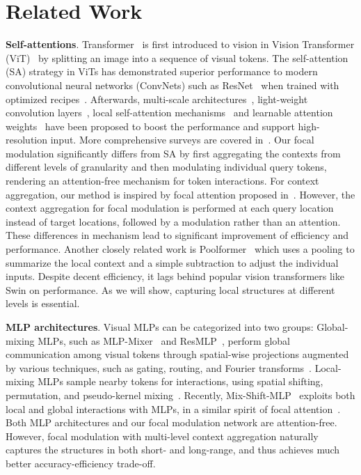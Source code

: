 \documentclass{article}
\begin{document}
 \section{Related Work}
\label{Sec:RelatedWork}
\textbf{Self-attentions}. 
Transformer~\cite{vaswani2017attention} is first introduced to vision in Vision Transformer (ViT)~\cite{dosovitskiy2020image} by splitting an image into a sequence of visual tokens. The self-attention (SA) strategy in ViTs has demonstrated superior performance to modern convolutional neural networks (ConvNets) such as ResNet~\cite{he2016deep} when trained with optimized recipes~\cite{dosovitskiy2020image,touvron2020training}. Afterwards, multi-scale architectures~\cite{chen2021crossvit,wang2021pyramid,xu2021co}, light-weight convolution layers~\cite{wu2021cvt,guo2021cmt,li2021localvit}, local self-attention mechanisms~\cite{liu2021swin,zhang2021multi,chu2021twins, yang2021focal} and learnable attention weights~\cite{yuan2021volo} have been proposed to boost the performance and support high-resolution input. More comprehensive surveys are covered in~\cite{khan2021transformers,han2020survey,khan2021transformers}. Our focal modulation significantly differs from SA by first aggregating the contexts from different levels of granularity and then modulating individual query tokens, rendering an attention-free mechanism for token interactions. For context aggregation, our method is inspired by focal attention proposed in~\cite{yang2021focal}. However, the context aggregation for focal modulation is performed at each query location instead of target locations, followed by a modulation rather than an attention. These differences in mechanism lead to significant improvement of efficiency and performance. Another closely related work is Poolformer~\cite{yu2021metaformer} which uses a pooling to summarize the local context and a simple subtraction to adjust the individual inputs. Despite decent efficiency, it lags behind popular vision transformers like Swin on performance. As we will show, capturing local structures at different levels is essential. 

\textbf{MLP architectures}. 
Visual MLPs can be categorized into two groups:  Global-mixing MLPs, such as MLP-Mixer~\cite{mlp-mixer} and ResMLP~\cite{resmlp}, perform global communication among visual tokens through spatial-wise projections augmented by various techniques, such as gating, routing, and Fourier transforms~\cite{gmlp,lou2021sparse,tang2021sparse,tang2021image}.
 Local-mixing MLPs sample nearby tokens for interactions, using spatial shifting, permutation, and pseudo-kernel mixing~\cite{yu2021s2,hou2021vision,lian2021mlp,chen2021cyclemlp,guo2021hire}. Recently, Mix-Shift-MLP~\cite{zheng2022mixing} exploits both local and global interactions with MLPs, in a similar spirit of focal attention~\cite{yang2021focal}. Both MLP architectures and our focal modulation network are attention-free. However, focal modulation  with multi-level context aggregation naturally captures the structures in both short- and long-range, and thus achieves much better accuracy-efficiency trade-off.
\end{document}
